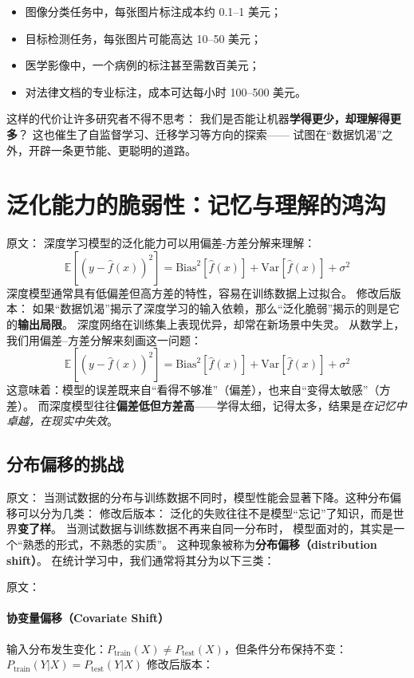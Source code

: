 \begin{itemize}
\item 图像分类任务中，每张图片标注成本约 0.1–1 美元；
\item 目标检测任务，每张图片可能高达 10–50 美元；
\item 医学影像中，一个病例的标注甚至需数百美元；
\item 对法律文档的专业标注，成本可达每小时 100–500 美元。
\end{itemize}

这样的代价让许多研究者不得不思考：  
我们是否能让机器\textbf{学得更少，却理解得更多}？  
这也催生了自监督学习、迁移学习等方向的探索——  
试图在“数据饥渴”之外，开辟一条更节能、更聪明的道路。

\section{泛化能力的脆弱性：记忆与理解的鸿沟}

原文：
深度学习模型的泛化能力可以用偏差-方差分解来理解：
$$\mathbb{E}[(y - \hat{f}(x))^2] = \text{Bias}^2[\hat{f}(x)] + \text{Var}[\hat{f}(x)] + \sigma^2$$
深度模型通常具有低偏差但高方差的特性，容易在训练数据上过拟合。
修改后版本：
如果“数据饥渴”揭示了深度学习的输入依赖，那么“泛化脆弱”揭示的则是它的\textbf{输出局限}。  
深度网络在训练集上表现优异，却常在新场景中失灵。  
从数学上，我们用偏差–方差分解来刻画这一问题：  
$$\mathbb{E}[(y - \hat{f}(x))^2] = \text{Bias}^2[\hat{f}(x)] + \text{Var}[\hat{f}(x)] + \sigma^2$$  
这意味着：模型的误差既来自“看得不够准”（偏差），也来自“变得太敏感”（方差）。  
而深度模型往往\textbf{偏差低但方差高}——学得太细，记得太多，结果是\textit{在记忆中卓越，在现实中失效}。



\subsection{分布偏移的挑战}

原文：
当测试数据的分布与训练数据不同时，模型性能会显著下降。这种分布偏移可以分为几类：
修改后版本：
泛化的失败往往不是模型“忘记”了知识，而是世界\textbf{变了样}。  
当测试数据与训练数据不再来自同一分布时，  
模型面对的，其实是一个“熟悉的形式，不熟悉的实质”。  
这种现象被称为\textbf{分布偏移（distribution shift）}。  
在统计学习中，我们通常将其分为以下三类：

原文：
\paragraph{协变量偏移（Covariate Shift）}
输入分布发生变化：$P_{\text{train}}(X) \neq P_{\text{test}}(X)$，但条件分布保持不变：$P_{\text{train}}(Y|X) = P_{\text{test}}(Y|X)$
修改后版本：
